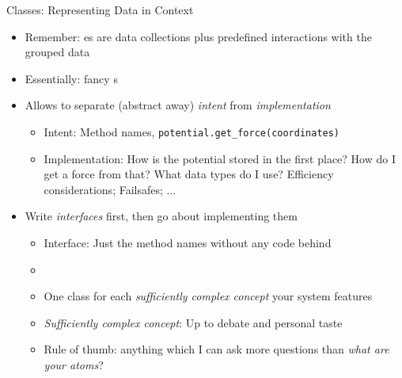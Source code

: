 
\begin{frame}{Classes: Representing Data in Context}
%
\begin{itemize}
\item Remember: es are data collections plus predefined interactions with the grouped data
\item Essentially: fancy s
\item Allows to separate (abstract away) \emph{intent} from \emph{implementation}
	\begin{itemize}
	\item Intent: Method names, \zB \texttt{potential.get\_force(coordinates)}
	\item Implementation: How is the potential stored in the first place? How do I get a force from that? What data types do I use? Efficiency considerations; Failsafes; ...
	\end{itemize}
\item Write \emph{interfaces} first, then go about implementing them
	\begin{itemize}
	\item Interface: Just the method names without any code behind
	\item {}
	\item One class for each \emph{sufficiently complex concept} your system features
	\item \emph{Sufficiently complex concept}: Up to debate and personal taste
	\item Rule of thumb: anything which I can ask more questions than \emph{what are your atoms}?
	\end{itemize}
\end{itemize}
%
\end{frame}


